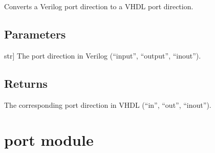 \documentclass[letterpaper,10pt,english]{sphinxmanual}
\begin{document}
\begin{fulllineitems}
\label{\detokenize{my_parser:my_parser.port_direction}}
\pysigstartsignatures
{}
\pysigstopsignatures
\sphinxAtStartPar
Converts a Verilog port direction to a VHDL port direction.


\subsection{Parameters}
\label{\detokenize{my_parser:id4}}\begin{description}
\sphinxlineitem{direction}{[}str{]}
\sphinxAtStartPar
The port direction in Verilog (“input”, “output”, “inout”).

\end{description}


\subsection{Returns}
\label{\detokenize{my_parser:id5}}\begin{description}
\sphinxAtStartPar
The corresponding port direction in VHDL (“in”, “out”, “inout”).

\end{description}

\end{fulllineitems}


\sphinxstepscope


\section{port module}
\label{\detokenize{port:module-port}}\label{\detokenize{port:port-module}}\label{\detokenize{port::doc}}
\end{document}
